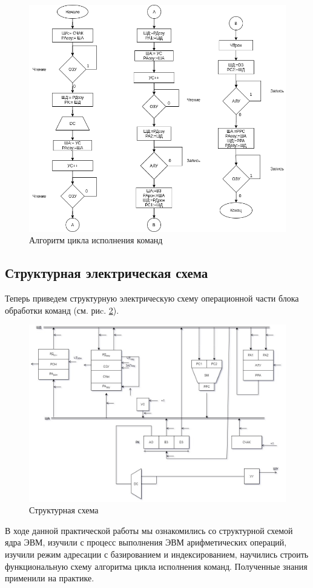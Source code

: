 \documentclass[a4paper,14pt]{extarticle}
\begin{document}
\begin{figure}[htbp]
	\centering
	\includegraphics[width=0.6\linewidth]{images/func-alg3}
	\caption{Алгоритм цикла исполнения команд}
	\label{fig:func-alg}
\end{figure}
\newpage

\subsection{Структурная электрическая схема}
Теперь приведем структурную электрическую схему операционной части блока обработки команд (см. риc. \ref{fig:unit}).
\begin{figure}[htpb]
	\centering
	\includegraphics[width=0.6\linewidth]{images/pract3}
	\caption{Структурная схема}
	\label{fig:unit}
\end{figure}


В ходе данной практической работы мы ознакомились со структурной схемой ядра ЭВМ, изучили с процесс выполнения ЭВМ арифметических операций, изучили режим адресации с базированием и индексированием, научились строить функциональную схему алгоритма цикла исполнения команд. Полученные знания применили на практике.
\end{document}
